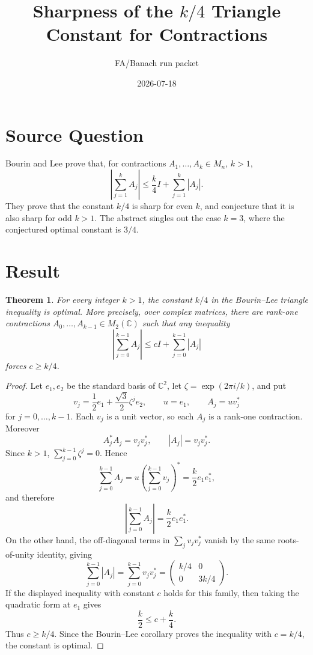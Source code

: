 \documentclass[11pt]{article}
\title{Sharpness of the \(k/4\) Triangle Constant for Contractions}
\author{FA/Banach run packet}
\date{2026-07-18}
\newtheorem*{theorem}{Theorem}
\newcommand{\C}{\mathbb C}
\begin{document}
\maketitle

\section*{Source Question}

Bourin and Lee \cite[Corollary 4.4]{BL} prove that, for contractions
\(A_1,\ldots,A_k\in M_n\), \(k>1\),
\[
  \left|\sum_{j=1}^k A_j\right|
  \leq \frac{k}{4}I+\sum_{j=1}^k |A_j|.
\]
They prove that the constant \(k/4\) is sharp for even \(k\), and conjecture
that it is also sharp for odd \(k>1\).  The abstract singles out the case
\(k=3\), where the conjectured optimal constant is \(3/4\).

\section*{Result}

\begin{theorem}
For every integer \(k>1\), the constant \(k/4\) in the Bourin--Lee triangle
inequality is optimal.  More precisely, over complex matrices, there are
rank-one contractions \(A_0,\ldots,A_{k-1}\in M_2(\C)\) such that any inequality
\[
  \left|\sum_{j=0}^{k-1} A_j\right|
  \leq c I+\sum_{j=0}^{k-1}|A_j|
\]
forces \(c\geq k/4\).
\end{theorem}

\begin{proof}
Let \(e_1,e_2\) be the standard basis of \(\C^2\), let
\(\zeta=\exp(2\pi i/k)\), and put
\[
  v_j=\frac{1}{2}e_1+\frac{\sqrt3}{2}\zeta^j e_2,\qquad
  u=e_1,\qquad
  A_j=uv_j^*
\]
for \(j=0,\ldots,k-1\).  Each \(v_j\) is a unit vector, so each \(A_j\) is a
rank-one contraction.  Moreover
\[
  A_j^*A_j=v_jv_j^*,
  \qquad
  |A_j|=v_jv_j^*.
\]
Since \(k>1\), \(\sum_{j=0}^{k-1}\zeta^j=0\).  Hence
\[
  \sum_{j=0}^{k-1}A_j
  =
  u\left(\sum_{j=0}^{k-1}v_j\right)^*
  =\frac{k}{2}e_1e_1^*,
\]
and therefore
\[
  \left|\sum_{j=0}^{k-1}A_j\right|
  =\frac{k}{2}e_1e_1^*.
\]
On the other hand, the off-diagonal terms in \(\sum_j v_jv_j^*\) vanish by the
same roots-of-unity identity, giving
\[
  \sum_{j=0}^{k-1}|A_j|
  =
  \sum_{j=0}^{k-1}v_jv_j^*
  =
  \begin{pmatrix}
    k/4 & 0\\
    0 & 3k/4
  \end{pmatrix}.
\]
If the displayed inequality with constant \(c\) holds for this family, then
taking the quadratic form at \(e_1\) gives
\[
  \frac{k}{2}
  \leq c+\frac{k}{4}.
\]
Thus \(c\geq k/4\).  Since the Bourin--Lee corollary proves the inequality with
\(c=k/4\), the constant is optimal.
\end{proof}
\end{document}
